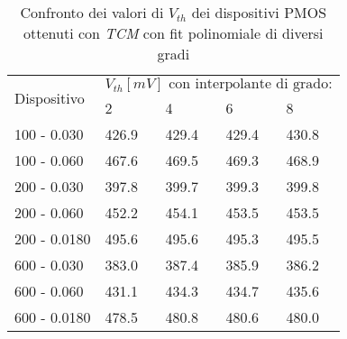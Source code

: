 \begin{table}[h]
  \renewcommand{\arraystretch}{1.3}
  \centering
  \begin{tabular}{m{2.1cm} m{2cm} m{2cm} m{2cm} m{2cm}}
    \toprule
    \multirow{2}{*}{Dispositivo} & \multicolumn{4}{c}{$V_{th} [mV] \text{ con interpolante di grado:}$}                         \\
    \cmidrule{2-5}
                                 & 2                                                                    & 4     & 6     & 8     \\
    \midrule
    100 - 0.030                     & 426.9                                                                & 429.4 & 429.4 & 430.8 \\
    \hline
    100 - 0.060                     & 467.6                                                                & 469.5 & 469.3 & 468.9 \\
    \hline
    200 - 0.030                     & 397.8                                                                & 399.7 & 399.3 & 399.8 \\
    \hline
    200 - 0.060                     & 452.2                                                                & 454.1 & 453.5 & 453.5 \\
    \hline
    200 - 0.0180                    & 495.6                                                                & 495.6 & 495.3 & 495.5 \\
    \hline
    600 - 0.030                     & 383.0                                                                & 387.4 & 385.9 & 386.2 \\
    \hline
    600 - 0.060                     & 431.1                                                                & 434.3 & 434.7 & 435.6 \\
    \hline
    600 - 0.0180                    & 478.5                                                                & 480.8 & 480.6 & 480.0 \\

    \bottomrule
  \end{tabular}
  \caption{Confronto dei valori di $V_{th}$ dei dispositivi PMOS ottenuti con \emph{TCM} con fit polinomiale di diversi gradi}
  \label{tab:GradiTCM}
\end{table}

